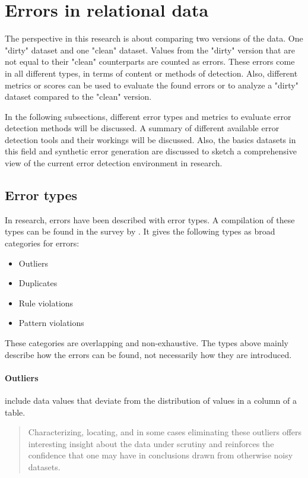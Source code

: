 \section{Errors in relational data}
The perspective in this research is about comparing two versions of the data. One "dirty" dataset and one "clean" dataset. Values from the "dirty" version that are not equal to their "clean" counterparts are counted as errors. These errors come in all different types, in terms of content or methods of detection. Also, different metrics or scores can be used to evaluate the found errors or to analyze a "dirty" dataset compared to the "clean" version.
 
In the following subsections, different error types and metrics to evaluate error detection methods will be discussed. A summary of different available error detection tools and their workings will be discussed. Also, the basics datasets in this field and synthetic error generation are discussed to sketch a comprehensive view of the current error detection environment in research.

\subsection{Error types}
\label{subsec:errortypes}
In research, errors have been described with error types. A compilation of these types can be found in the survey by \cite{Abedjan2016-jc}. It gives the following types as broad categories for errors:
\begin{itemize}
    \item Outliers
    \item Duplicates
    \item Rule violations
    \item Pattern violations
\end{itemize}

These categories are overlapping and non-exhaustive. The types above mainly describe how the errors can be found, not necessarily how they are introduced. 

\paragraph{Outliers} include data values that deviate from the distribution of values in a column of a table.
\blockquote{Characterizing,
locating, and in some cases eliminating these outliers offers
interesting insight about the data under scrutiny and reinforces
the confidence that one may have in conclusions drawn from
otherwise noisy datasets. \cite{Pit--Claudel2016-dj}}. 

